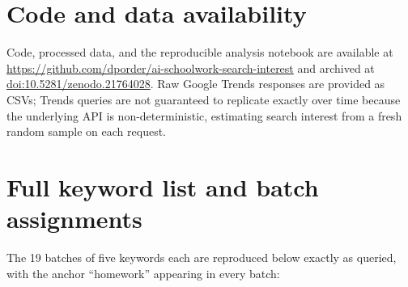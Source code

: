 \documentclass[11pt]{article}
\begin{document}
\section*{Code and data availability}
Code, processed data, and the reproducible analysis notebook are available at \url{https://github.com/dporder/ai-schoolwork-search-interest} and archived at \href{https://doi.org/10.5281/zenodo.21764028}{doi:10.5281/zenodo.21764028}. Raw Google Trends responses are provided as CSVs; Trends queries are not guaranteed to replicate exactly over time because the underlying API is non-deterministic, estimating search interest from a fresh random sample on each request.




\appendix
\section{Full keyword list and batch assignments}
\label{sec:appkeywords}

The 19 batches of five keywords each are reproduced below exactly as queried, with the anchor ``homework'' appearing in every batch:
\end{document}
